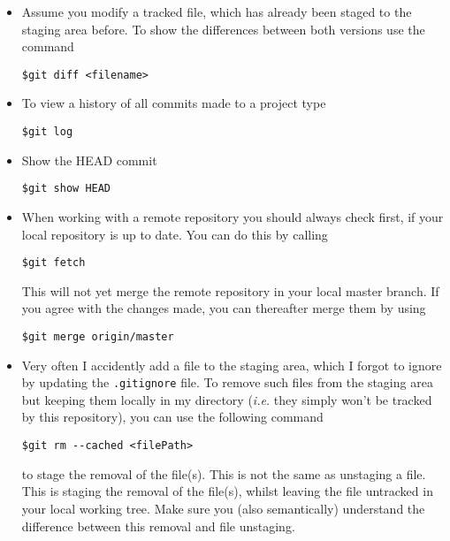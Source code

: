 \documentclass{article}
\begin{document}
\begin{itemize}

\item Assume you modify a tracked file, which has already been staged to the staging area before. To show the differences between both versions use the command
\begin{lstlisting}
$git diff <filename>
\end{lstlisting}

\item To view a history of all commits made to a project type
\begin{lstlisting}
$git log
\end{lstlisting}

\item Show the HEAD commit
\begin{lstlisting}
$git show HEAD
\end{lstlisting}

\item When working with a remote repository you should always check first, if your local repository is up to date.
You can do this by calling
\begin{lstlisting}
$git fetch
\end{lstlisting}
This will not yet merge the remote repository in your local master branch. If you agree with the changes made, you can thereafter merge them by using
\begin{lstlisting}
$git merge origin/master
\end{lstlisting}

\item Very often I accidently add a file to the staging area, which I forgot to ignore by updating the \verb|.gitignore| file.
To remove such files from the staging area but keeping them locally in my directory (\textit{i.e.} they simply won't be tracked by this repository), you can use the following command
\begin{lstlisting}
$git rm --cached <filePath>
\end{lstlisting}
to stage the removal of the file(s). This is not the same as unstaging a file. This is staging the removal of the file(s), whilst leaving the file untracked in your local working tree. Make sure you (also semantically) understand the difference
between this removal and file unstaging.

\end{itemize}
\end{document}
